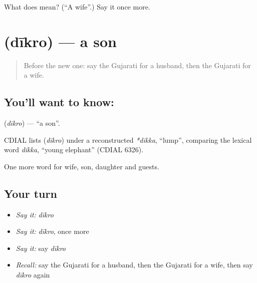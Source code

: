 \begin{tcolorbox}[breakable,colback=teal!4,colframe=teal!35!black,title={Before you move on}]
What does  mean? (\textquotedblleft{}A wife\textquotedblright{}.) Say it once more.
\end{tcolorbox}
\section[\texorpdfstring{\gu{દીકરો} (dīkro)}{દીકરો (dīkro)}]{ (dīkro) — a son}

\label{lesson:GU-C53-son}



\begin{quote}
Before the new one: say the Gujarati for a husband, then the Gujarati for a wife.
\end{quote}

\subsection*{You'll want to know: }
\textbf{} (\emph{dīkro}) — \textquotedblleft{}a son\textquotedblright{}.

\begin{cousinweb}
CDIAL lists \textbf{} (\emph{dīkro}) under a reconstructed \emph{*dikka}, \textquotedblleft{}lump\textquotedblright{}, comparing the lexical word \emph{dikka}, \textquotedblleft{}young elephant\textquotedblright{} (CDIAL 6326).
\end{cousinweb}

\begin{grammarlens}[title={What you've built}]
One more word for wife, son, daughter and guests.
\end{grammarlens}

\subsection*{Your turn}
\begin{itemize}
\raggedright
  \item \emph{Say it:} \emph{dīkro}
  \item \emph{Say it:} \emph{dīkro}, once more
  \item \emph{Say it:} say \emph{dīkro}
  \item \emph{Recall:} say the Gujarati for a husband, then the Gujarati for a wife, then say \emph{dīkro} again
\end{itemize}

